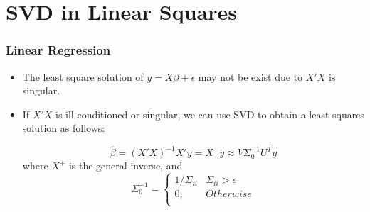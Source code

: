 \documentclass[10pt]{beamer}
\begin{document}
\section{SVD in Linear Squares}

\begin{frame}
  \frametitle{Linear Regression}

  \begin{itemize}
  \item The least square solution of $y=X\beta + \epsilon$ may not be
    exist due to $X'X$ is singular.

  \item If $X'X$ is ill-conditioned or singular, we can use SVD to
    obtain a least squares solution as follows:

    \begin{equation*}
      \hat \beta = (X'X)^{-1}X'y = X^{+} y \approx V \Sigma_0^{-1} U^T y
    \end{equation*}
    where $X^{+}$ is the general inverse, and
    \begin{equation*}
      \Sigma_0^{-1} = \begin{cases}
        1/\Sigma_{ii} & \Sigma_{ii} > \epsilon\\
        0, & Otherwise\\
      \end{cases}
    \end{equation*}

  \end{itemize}


\end{frame}

\begin{frame}

\end{frame}







\end{document}
